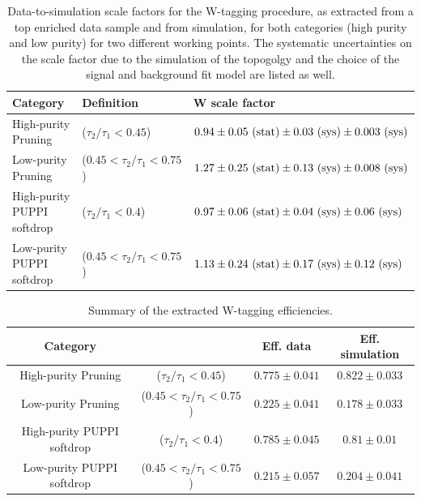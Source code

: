 \begin{table}[h!]
   \centering
   \begin{tabular}{lll}
   \hline
   Category & Definition & W scale factor\\
   \hline
   High-purity Pruning & ($\tau_2 / \tau_1 < 0.45$)             &$0.94 \pm 0.05~\rm{(stat)} \pm 0.03~\rm{(sys)} \pm 0.003~\rm{(sys)}$\\
   Low-purity Pruning & ($0.45 < \tau_2 / \tau_1 < 0.75$)       &$1.27 \pm 0.25~\rm{(stat)} \pm 0.13~\rm{(sys)} \pm 0.008~\rm{(sys)}$\\
   \hline
   High-purity PUPPI softdrop & ($\tau_2 / \tau_1 < 0.4$)       &$0.97 \pm 0.06~\rm{(stat)} \pm 0.04~\rm{(sys)} \pm 0.06~\rm{(sys)}$\\
   Low-purity PUPPI softdrop & ($0.45 < \tau_2 / \tau_1 < 0.75$)&$1.13 \pm 0.24~\rm{(stat)} \pm 0.17~\rm{(sys)}  \pm 0.12~\rm{(sys)}$\\
   \end{tabular}
   \label{tab:WtagSFs}
   \caption{Data-to-simulation scale factors for the W-tagging procedure, as extracted from a top enriched data sample and from simulation, for both categories (high purity and low purity) for two different working points. The systematic uncertainties on the scale factor due to the simulation of the \ttbar topogolgy and the choice of the signal and background fit model are listed as well. }
\end{table}

\begin{table}[!htb]
 \begin{center}
\label{tab:WtagEffs}
 \begin{tabular}{c|c|c|c}
  Category & & Eff. data & Eff. simulation \\
  \hline
  High-purity Pruning & ($\tau_2 / \tau_1 < 0.45$)              & $0.775 \pm 0.041 $& $0.822 \pm 0.033$\\
  Low-purity Pruning & ($0.45 < \tau_2 / \tau_1 < 0.75$)        & $0.225 \pm 0.041 $& $0.178 \pm 0.033$\\
  \hline
  High-purity PUPPI softdrop & ($\tau_2 / \tau_1 < 0.4$)        & $0.785 \pm 0.045 $& $0.81 \pm 0.01$\\
  Low-purity PUPPI softdrop & ($0.45 < \tau_2 / \tau_1 < 0.75$) & $0.215 \pm 0.057 $& $0.204 \pm 0.041$\\
 \end{tabular}
 \caption{Summary of the extracted W-tagging efficiencies.}
 \end{center}
\end{table}


